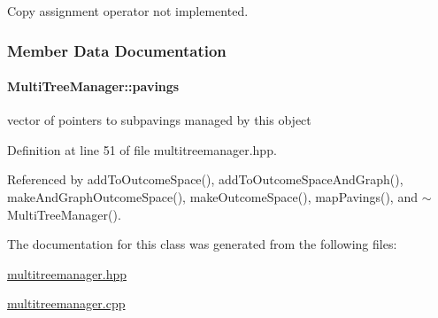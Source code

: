 \-Copy assignment operator not implemented. 



\subsubsection{\-Member \-Data \-Documentation}
\hypertarget{classMultiTreeManager_a69e27576dc42a5433ecc8723503638d0}{
\paragraph[{pavings}]{ {\bf \-Multi\-Tree\-Manager\-::pavings}}}\label{classMultiTreeManager_a69e27576dc42a5433ecc8723503638d0}


vector of pointers to subpavings managed by this object 



\-Definition at line 51 of file multitreemanager.\-hpp.



\-Referenced by add\-To\-Outcome\-Space(), add\-To\-Outcome\-Space\-And\-Graph(), make\-And\-Graph\-Outcome\-Space(), make\-Outcome\-Space(), map\-Pavings(), and $\sim$\-Multi\-Tree\-Manager().



\-The documentation for this class was generated from the following files\-:\begin{DoxyCompactItemize}
\item 
\hyperlink{multitreemanager_8hpp}{multitreemanager.\-hpp}\item 
\hyperlink{multitreemanager_8cpp}{multitreemanager.\-cpp}\end{DoxyCompactItemize}

